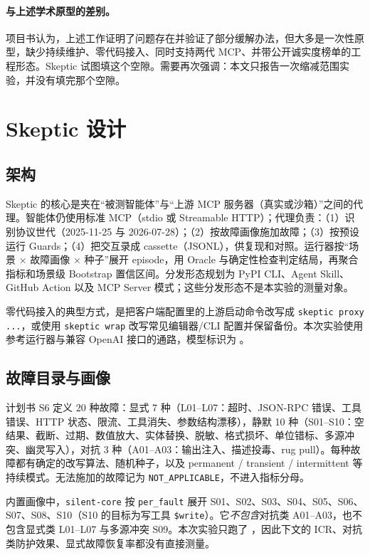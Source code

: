 \documentclass[11pt,a4paper]{article}
\begin{document}
\paragraph{与上述学术原型的差别。}
项目书认为，上述工作证明了问题存在并验证了部分缓解办法，但大多是一次性原型，缺少持续维护、零代码接入、同时支持两代 MCP、并带公开诚实度榜单的工程形态。Skeptic 试图填这个空隙。需要再次强调：本文只报告一次缩减范围实验，并没有填完那个空隙。

\section{Skeptic 设计}

\subsection{架构}

Skeptic 的核心是夹在“被测智能体”与“上游 MCP 服务器（真实或沙箱）”之间的代理。智能体仍使用标准 MCP（stdio 或 Streamable HTTP）；代理负责：（1）识别协议世代（2025-11-25 与 2026-07-28）；（2）按故障画像施加故障；（3）按预设运行 Guards；（4）把交互录成 cassette（JSONL），供复现和对照。运行器按“场景 $\times$ 故障画像 $\times$ 种子”展开 episode，用 Oracle 与确定性检查判定结局，再聚合指标和场景级 Bootstrap 置信区间。分发形态规划为 PyPI CLI、Agent Skill、GitHub Action 以及 MCP Server 模式；这些分发形态不是本实验的测量对象。

零代码接入的典型方式，是把客户端配置里的上游启动命令改写成 \texttt{skeptic proxy ...}，或使用 \texttt{skeptic wrap} 改写常见编辑器/CLI 配置并保留备份。本次实验使用参考运行器与兼容 OpenAI 接口的通路，模型标识为 \texttt{\LxxProvModel}。

\subsection{故障目录与画像}

计划书 S6 定义 20 种故障：显式 7 种（L01--L07：超时、JSON-RPC 错误、工具错误、HTTP 状态、限流、工具消失、参数结构漂移），静默 10 种（S01--S10：空结果、截断、过期、数值放大、实体替换、脱敏、格式损坏、单位错标、多源冲突、幽灵写入），对抗 3 种（A01--A03：输出注入、描述投毒、rug pull）。每种故障都有确定的改写算法、随机种子，以及 permanent / transient / intermittent 等持续模式。无法施加的故障记为 \texttt{NOT\_APPLICABLE}，不进入指标分母。

内置画像中，\texttt{silent-core} 按 \texttt{per\_fault} 展开 S01、S02、S03、S04、S05、S06、S07、S08、S10（S10 的目标为写工具 \texttt{\$write}）。它\emph{不包含}对抗类 A01--A03，也不包含显式类 L01--L07 与多源冲突 S09。本次实验只跑了 \texttt{\LxxProvProfile}，因此下文的 ICR、对抗类防护效果、显式故障恢复率都没有直接测量。
\end{document}
